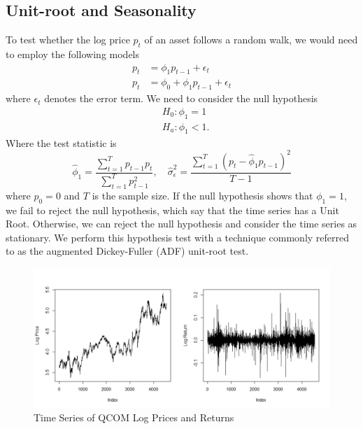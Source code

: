 \documentclass[12pt]{article}
\begin{document}
\subsection*{Unit-root and Seasonality}
To test whether the log price $p_t$ of an asset follows a random walk, we would need to employ the following models
\begin{equation}
	\begin{aligned}
		p_t&=\phi_1p_{t-1}+\epsilon_t\\
		p_t&=\phi_0+\phi_1p_{t-1}+\epsilon_t
	\end{aligned}
\end{equation}
where $\epsilon_t$ denotes the error term. We need to consider the null hypothesis
\begin{equation}
	\begin{aligned}
		&H_0:\phi_1=1\\
		&H_a:\phi_1<1.
	\end{aligned}
\end{equation}
Where the test statistic is
\begin{equation}
	\hat{\phi}_1=\frac{\sum_{t=1}^{T}p_{t-1}p_t}{\sum_{t=1}^{T}p^{2}_{t-1}},\quad\hat{\sigma}^2_\epsilon=\frac{\sum_{t=1}^{T}(p_t-\hat{\phi}_1p_{t-1})^2}{T-1}
\end{equation}
where $p_0=0$ and $T$ is the sample size. If the null hypothesis shows that $\phi_1=1$, we fail to reject the null hypothesis, which say that the time series has a Unit Root. Otherwise, we can reject the null hypothesis and consider the time series as stationary. We perform this hypothesis test with a technique commonly referred to as the augmented Dickey-Fuller (ADF) unit-root test.

\begin{figure}[h]
	\centering
	\includegraphics[width=0.9\linewidth]{plots/qcom_log_price_return.png}
	\caption{Time Series of QCOM Log Prices and Returns }
	\label{fig:qcom_log_price}
\end{figure}
\end{document}
